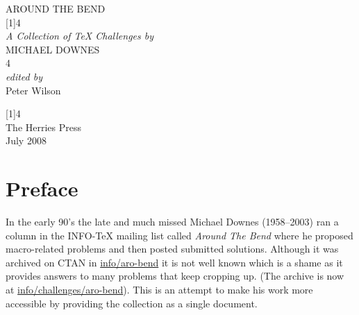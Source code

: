 \nouppercaseheads
{}
\setlength{\beforechapskip}{2\onelineskip}
\setlength{\beforechapskip}{0pt}
\setlength{\afterchapskip}{1\onelineskip}

\makeindex

\newlength{\drop}
\providecommand*{\wb}[2]{\fontsize{#1}{#2}\usefont{U}{webo}{xl}{n}}
\newcommand*{\titleAB}{\begingroup
\drop=4\baselineskip
\centering
\vspace*{\drop}
{\Huge AROUND THE BEND}\\[\drop]
{\hspace*{1.5em}\scalebox{8}[1]{{\wb{10}{12}4}}}\\[\drop]
{\Large\itshape A Collection of TeX Challenges by}\\[\baselineskip]
{\Large MICHAEL DOWNES}\\[\baselineskip]
{\wb{10}{12}4}\\[\baselineskip]
{\Large\itshape edited by}\\[\baselineskip]
{\Large Peter Wilson}\par
\vfill
{\hspace*{1.5em}\scalebox{8}[1]{{\wb{10}{12}4}}}\\[\drop]
{\large The Herries Press}\\
{July 2008}\par
\vspace*{\drop}
\endgroup}


\tightlists
\raggedbottom

\frontmatter

\thispagestyle{empty}
\titleAB
\cleardoublepage
\tableofcontents

\chapter{Preface}

    In the early 90's the late and much missed Michael Downes (1958--2003)
ran a column in the INFO-TeX mailing list
called \emph{Around The Bend} where he proposed macro-related problems and 
then posted
submitted solutions. Although it was archived on CTAN in \url{info/aro-bend}
it is not well known which is a shame as it provides
answers to many problems that keep cropping up. (The archive is now
at \url{info/challenges/aro-bend}). This is an attempt to
make his work more accessible by providing the collection as a single 
document. 

